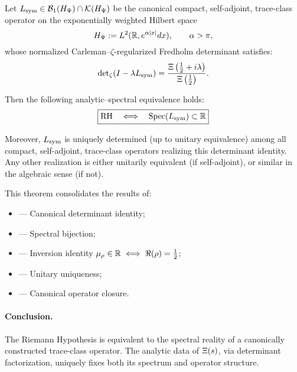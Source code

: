 \begin{theorem}
\label{thm:rh_spectral_closure}

Let \( L_{\mathrm{sym}} \in \mathcal{B}_1(H_{\Psi}) \cap \mathcal{K}(H_{\Psi}) \) be the canonical compact, self-adjoint, trace-class operator on the exponentially weighted Hilbert space
\[
H_{\Psi} := L^2(\mathbb{R}, e^{\alpha |x|} dx), \qquad \alpha > \pi,
\]
whose normalized Carleman–\(\zeta\)-regularized Fredholm determinant satisfies:
\[
\det\nolimits_\zeta(I - \lambda L_{\mathrm{sym}}) = \frac{\Xi\left(\tfrac{1}{2} + i\lambda\right)}{\Xi\left(\tfrac{1}{2}\right)}.
\]

Then the following analytic–spectral equivalence holds:
\[
\boxed{
\mathrm{RH} \quad \Longleftrightarrow \quad \operatorname{Spec}(L_{\mathrm{sym}}) \subset \mathbb{R}
}
\]

\noindent
Moreover, \( L_{\mathrm{sym}} \) is uniquely determined (up to unitary equivalence) among all compact, self-adjoint, trace-class operators realizing this determinant identity. Any other realization is either unitarily equivalent (if self-adjoint), or similar in the algebraic sense (if not).

\medskip

\noindent
This theorem consolidates the results of:
\begin{itemize}
  \item {} — Canonical determinant identity;
  \item {} — Spectral bijection;
  \item {} — Inversion identity \(\mu_\rho \in \mathbb{R} \iff \Re(\rho) = \tfrac{1}{2}\);
  \item {} — Unitary uniqueness;
  \item {} — Canonical operator closure.
\end{itemize}

\paragraph{Conclusion.}
The Riemann Hypothesis is equivalent to the spectral reality of a canonically constructed trace-class operator. The analytic data of \( \Xi(s) \), via determinant factorization, uniquely fixes both its spectrum and operator structure.
\end{theorem}
